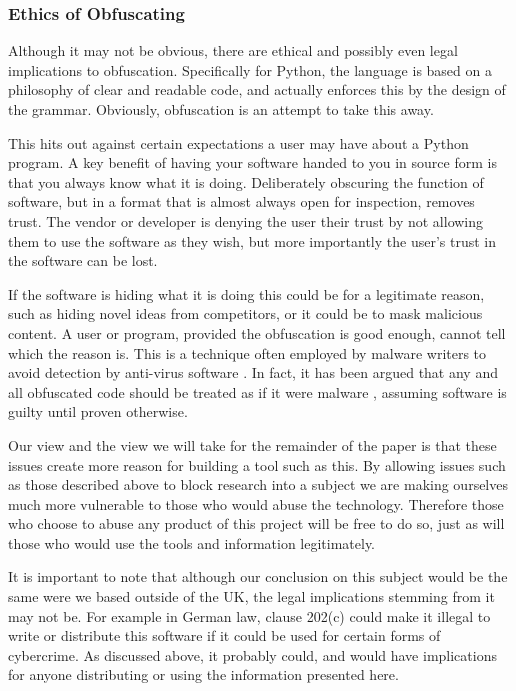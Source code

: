 \documentclass[twoside,a4paper]{report}
\begin{document}
\subsubsection{Ethics of Obfuscating}

Although it may not be obvious, there are ethical and possibly even legal implications to obfuscation.
Specifically for Python, the language is based on a philosophy of clear and readable code, and actually
enforces this by the design of the grammar. Obviously, obfuscation is an attempt to take this away.

This hits out against certain expectations a user may have about a Python program. A key benefit of having your
software handed to you in source form is that you always know what it is doing. Deliberately obscuring the
function of software, but in a format that is almost always open for inspection, removes trust. The vendor or developer is
denying the user their trust by not allowing them to use the software as they wish, but more importantly the user's
trust in the software can be lost.

If the software is hiding what it is doing this could be for a legitimate reason, such as hiding novel ideas
from competitors, or it could be to mask malicious content. A user or program, provided the obfuscation is
good enough, cannot tell which the reason is. This is a technique often employed by malware
writers to avoid detection by anti-virus software \cite{dycodeobf}. In fact, it has been argued that any and
all obfuscated code should be treated as if it were malware \cite{noobf}, assuming software is guilty until
proven otherwise.

Our view and the view we will take for the remainder of the paper is that these issues create more reason for
building a tool such as this. By allowing issues such as those described above to block research into a subject
we are making ourselves much more vulnerable to those who would abuse the technology. Therefore those who choose to abuse any
product of this project will be free to do so, just as will those who would use the tools and information legitimately.

It is important to note that although our conclusion on this subject would be the same were we based outside of
the UK, the legal implications stemming from it may not be. For example in German law, clause 202(c) \cite{202c}
could make it illegal to write or distribute this software if it could be used for
certain forms of cybercrime. As discussed above, it probably could, and would have implications for anyone distributing
or using the information presented here.
\end{document}
